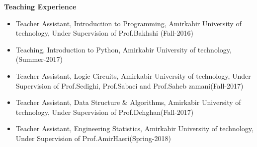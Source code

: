 \documentclass[a4paper,12pt,final]{memoir}
\newcommand{\Sep}{\vspace{1.5em}}
\newcommand{\SmallSep}{\vspace{0.5em}}
\newcommand{\CVSection}[1]
	{\Large\textbf{#1}\par
	\SmallSep\normalsize\normalfont}
\begin{document}
\Sep



\CVSection{Teaching Experience}
	\begin{itemize}
	\item  Teacher Assistant, Introduction to Programming, Amirkabir University of technology, Under Supervision of Prof.Bakhshi (Fall-2016)
	\end{itemize}
	\begin{itemize}
	\item  Teaching, Introduction to Python, Amirkabir University of technology, (Summer-2017)
	\end{itemize}
	\begin{itemize}
	\item   Teacher Assistant, Logic Circuits, Amirkabir University of technology, Under Supervision of Prof.Sedighi, Prof.Sabaei and Prof.Saheb zamani(Fall-2017)
	\end{itemize}
	\begin{itemize}
	\item   Teacher Assistant, Data Structure \& Algorithms, Amirkabir University of technology, Under Supervision of Prof.Dehghan(Fall-2017)
	\end{itemize}
	\begin{itemize}
	\item  Teacher Assistant, Engineering Statistics, Amirkabir University of technology, Under Supervision of Prof.AmirHaeri(Spring-2018)
	\end{itemize}
\Sep

\newpage
\normalsize\normalfont
\framebreak
\framebreak
\\
\end{document}
